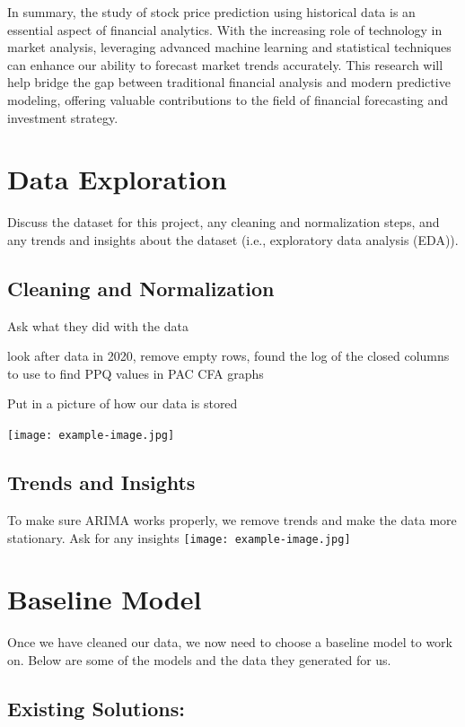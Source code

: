 \documentclass[conference]{IEEEtran}
\begin{document}
In summary, the study of stock price prediction using historical data is an essential aspect of financial analytics. With the increasing role of technology in market analysis, leveraging advanced machine learning and statistical techniques can enhance our ability to forecast market trends accurately. This research will help bridge the gap between traditional financial analysis and modern predictive modeling, offering valuable contributions to the field of financial forecasting and investment strategy.


\section{Data Exploration}

 Discuss the dataset for this project, any cleaning and normalization steps, and any trends and insights about the dataset (i.e., exploratory data analysis (EDA)).

 \subsection{Cleaning and Normalization}
Ask what they did with the data

look after data in 2020, remove empty rows, found the log of the closed columns to use to find PPQ values in PAC CFA graphs

Put in a picture of how our data is stored

\texttt{[image: example-image.jpg]} %


 \subsection{Trends and Insights}
 To make sure ARIMA works properly, we remove trends and make the data more stationary.  
 Ask for any insights
 \texttt{[image: example-image.jpg]} %

\section{Baseline Model}

Once we have cleaned our data, we now need to choose a baseline model to work on.  Below are some of the models and the data they generated for us.

\subsection{Existing Solutions: }
\end{document}
